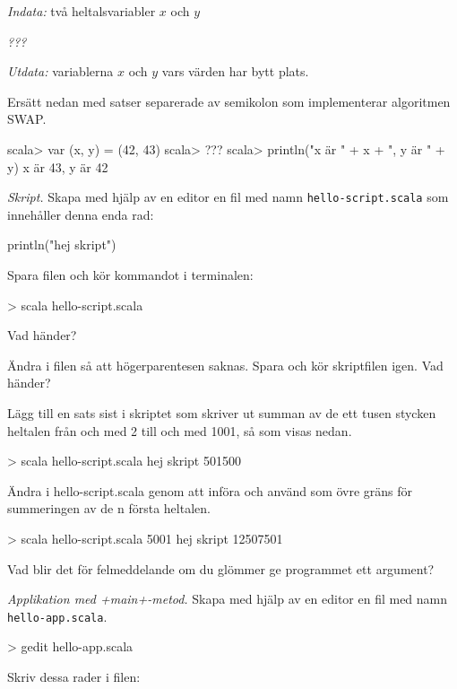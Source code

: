 \emph{Indata:} två heltalsvariabler $x$ och $y$ 

\emph{???}

\emph{Utdata:} variablerna $x$ och $y$ vars värden har bytt plats.

\Subtask Ersätt  nedan med satser separerade av semikolon som implementerar algoritmen SWAP.

\begin{REPL}
scala> var (x, y) = (42, 43)
scala> ???
scala> println("x är " + x + ", y är " + y)
x är 43, y är 42
\end{REPL}



\Task \emph{Skript.} Skapa med hjälp av en editor en fil med namn \texttt{hello-script.scala} som innehåller denna enda rad:
\begin{Code}
println("hej skript")
\end{Code}
Spara filen och kör kommandot  i terminalen:
\begin{REPL}
> scala hello-script.scala
\end{REPL}

\Subtask Vad händer?

\Subtask Ändra i filen så att högerparentesen saknas. Spara och kör skriptfilen igen. Vad händer?

\Subtask Lägg till en sats sist i skriptet som skriver ut summan av de ett tusen stycken heltalen från och med 2 till och med 1001, så som visas nedan.
\begin{REPL}
> scala hello-script.scala
hej skript
501500
\end{REPL}

\Subtask Ändra i hello-script.scala genom att införa  och använd  som övre gräns för summeringen av de n första heltalen.
\begin{REPL}
> scala hello-script.scala 5001
hej skript
12507501
\end{REPL}

\Subtask Vad blir det för felmeddelande om du glömmer ge programmet ett argument?


\Task \emph{Applikation med \code+main+-metod.} Skapa med hjälp av en editor en fil med namn \texttt{hello-app.scala}.
\begin{REPL}
> gedit hello-app.scala
\end{REPL}
Skriv dessa rader i filen:



